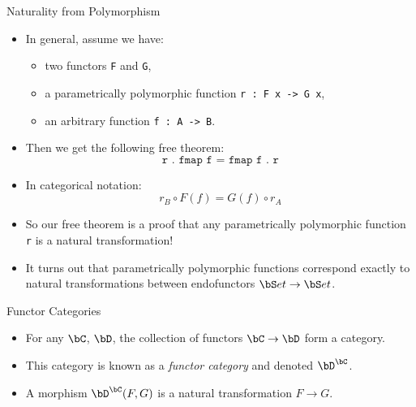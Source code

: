 \begin{frame}{Naturality from Polymorphism}
    \begin{itemize}
      \item In general, assume we have:
      \begin{itemize}
        \pause\item two functors \texttt{F} and \texttt{G},
        \pause\item a parametrically polymorphic function \texttt{r : F x -> G x},
        \pause\item an arbitrary function \texttt{f : A -> B}.
      \end{itemize}
      \pause\item Then we get the following free theorem:
      \begin{equation*}
       \texttt{r . fmap f = fmap f . r}
      \end{equation*}
      \vspace{-18pt}
      \pause\item In categorical notation:
      \begin{equation*}
        r_B \circ F(f) = G(f) \circ r_A
      \end{equation*}
      \vspace{-18pt}
      \pause\item So our free theorem is a proof that any parametrically polymorphic function \texttt{r} is a natural transformation!
      \pause\item It turns out that parametrically polymorphic functions correspond exactly to natural transformations between endofunctors $\bS et \to \bS et$.
    \end{itemize}
\end{frame}
\begin{frame}{Functor Categories}
 \begin{itemize}
  \item For any $\bC$, $\bD$, the collection of functors $\bC \to \bD$ form a category.
  \pause\item This category is known as a \textit{functor category} and denoted $\bD^\bC$.
  \pause\item A morphism $\bD^\bC(F, G)$ is a natural transformation $F \to G$.
 \end{itemize}
\end{frame}

